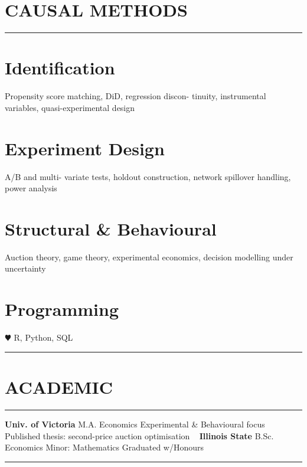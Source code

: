 %

\section{CAUSAL METHODS}
\vspace{-0.1cm}%
\noindent\rule{\textwidth}{0.4pt}
\vspace{-0.1cm}%
%
\section{\large Identification}
Propensity score matching, DiD, regression discon- tinuity, instrumental variables, quasi-experimental design
~
\section{\large Experiment Design}
A/B and multi- variate tests, holdout construction, network spillover handling, power analysis
~
\section{\large Structural \& Behavioural}
Auction theory, game theory, experimental economics, decision modelling under uncertainty
~
\section{\large Programming}
{\color{red} $\varheartsuit$} R, Python, SQL
%
\noindent\rule{\textwidth}{0.4pt}%
\vspace{-0.1cm}%
%
\section{ACADEMIC}
\vspace{-0.1cm}%
\noindent\rule{\textwidth}{0.4pt}
\vspace{-0.1cm}%
\textbf{\textcolor{uvicblue}{Univ. of Victoria}}
M.A. Economics
Experimental \& Behavioural focus
Published thesis: second-price auction optimisation
~
\textbf{\textcolor{isured}{Illinois State}}
B.Sc. Economics
Minor: Mathematics
Graduated w/Honours
%
\noindent\rule{\textwidth}{0.4pt}%
\vspace{-0.1cm}%
%
